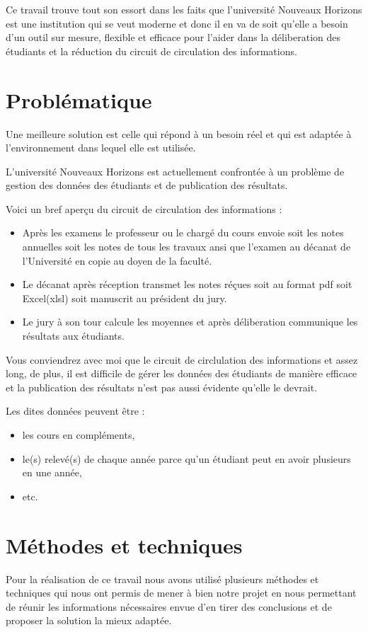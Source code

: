Ce travail trouve tout son essort dans les faits que l'université Nouveaux Horizons est une institution
qui se veut moderne et donc il en va de soit qu'elle a besoin d'un outil sur mesure, flexible et efficace
pour l'aider dans la déliberation des étudiants et la réduction du circuit de circulation des informations.

\section{Problématique}\label{sec:problematique}
Une meilleure solution est celle qui répond à un besoin réel et qui
est adaptée à l'environnement dans lequel elle est utilisée.

L'université Nouveaux Horizons est actuellement confrontée à un problème
de gestion des données des étudiants et de publication des résultats.

Voici un bref aperçu du circuit de circulation des informations :

\begin{itemize}
    \item Après les examens le professeur ou le chargé du cours envoie soit
    les notes annuelles soit les notes de tous les travaux ansi que
    l'examen au décanat de l'Université en copie au doyen de la faculté.
    \item Le décanat après réception transmet les notes réçues soit
    au format pdf soit Excel(xlsl) soit manuscrit au président du jury.
    \item Le jury à son tour calcule les moyennes et après déliberation
    communique les résultats aux étudiants.
\end{itemize}

Vous conviendrez avec moi que le circuit de circlulation des
informations et assez long, de plus, il est difficile de
gérer les données des étudiants de manière efficace et la publication
des résultats n'est pas aussi évidente qu'elle le devrait.

Les dites données peuvent être :
\begin{itemize}
    \item les cours en compléments,
    \item le(s) relevé(s) de chaque année parce qu'un
    étudiant peut en avoir plusieurs en une année,
    \item etc.
\end{itemize}

\section{Méthodes et techniques}\label{sec:methode}
Pour la réalisation de ce travail nous avons utilisé plusieurs méthodes et techniques qui nous ont permis de mener à bien notre projet
en nous permettant de réunir les informations nécessaires envue d'en tirer des conclusions et de proposer la solution la mieux adaptée.

